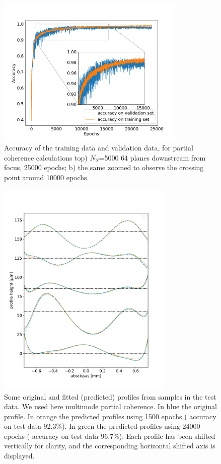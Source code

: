 \documentclass[preprint]{iucr}
\newcommand{\inred}[1]{{\color{red}#1}}
\begin{document}
 
\begin{figure}\label{fig:multimode}
    \includegraphics[width=0.8\textwidth]{figures/figure5.png}
    \caption{Accuracy of the training data and validation data, for partial coherence calculations top) $N_S$=5000 64 planes downstream from focus, 25000 epochs;
    b) the same zoomed to observe the crossing point around 10000 epochs.
    }
\end{figure}

\begin{figure}\label{fig:multimode}
\includegraphics[width=0.75\textwidth]{figures/figure6.pdf}
\caption{
Some original and fitted (predicted) profiles from samples in the test data. We used here multimode partial coherence. \inred{In blue the original profile. In orange the predicted profiles using 1500 epochs (
accuracy on test data 92.3\%). In green the predicted profiles using 24000 epochs (
accuracy on test data 96.7\%). Each profile has been shifted vertically for clarity, and the corresponding horizontal shifted axis is displayed.
    }}
\end{figure}
\end{document}
